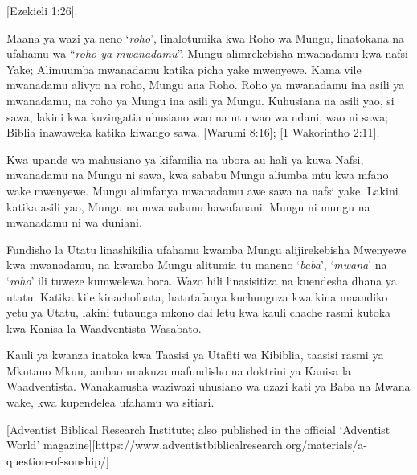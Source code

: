 [Ezekieli 1:26].

Maana ya wazi ya neno ‘\textit{roho}’, linalotumika kwa Roho wa Mungu, linatokana na ufahamu wa “\textit{roho ya mwanadamu}”. Mungu alimrekebisha mwanadamu kwa nafsi Yake; Alimuumba mwanadamu katika picha yake mwenyewe. Kama vile mwanadamu alivyo na roho, Mungu ana Roho. Roho ya mwanadamu ina asili ya mwanadamu, na roho ya Mungu ina asili ya Mungu. Kuhusiana na asili yao, si sawa, lakini kwa kuzingatia uhusiano wao na utu wao wa ndani, wao ni sawa; Biblia inawaweka katika kiwango sawa. [Warumi 8:16]; [1 Wakorintho 2:11].

Kwa upande wa mahusiano ya kifamilia na ubora au hali ya kuwa Nafsi, mwanadamu na Mungu ni sawa, kwa sababu Mungu aliumba mtu kwa mfano wake mwenyewe. Mungu alimfanya mwanadamu awe sawa na nafsi yake. Lakini katika asili yao, Mungu na mwanadamu hawafanani. Mungu ni mungu na mwanadamu ni wa duniani.

Fundisho la Utatu linashikilia ufahamu kwamba Mungu alijirekebisha Mwenyewe kwa mwanadamu, na kwamba Mungu alitumia tu maneno ‘\textit{baba}’, ‘\textit{mwana}’ na ‘\textit{roho}’ ili tuweze kumwelewa bora. Wazo hili linasisitiza na kuendesha dhana ya utatu. Katika kile kinachofuata, hatutafanya kuchunguza kwa kina maandiko yetu ya Utatu, lakini tutaunga mkono dai letu kwa kauli chache rasmi kutoka kwa Kanisa la Waadventista Wasabato.

Kauli ya kwanza inatoka kwa Taasisi ya Utafiti wa Kibiblia, taasisi rasmi ya Mkutano Mkuu, ambao unakuza mafundisho na doktrini ya Kanisa la Waadventista. Wanakanusha waziwazi uhusiano wa uzazi kati ya Baba na Mwana wake, kwa kupendelea ufahamu wa sitiari.

[Adventist Biblical Research Institute; also published in the official ‘Adventist World’ magazine][https://www.adventistbiblicalresearch.org/materials/a-question-of-sonship/]

